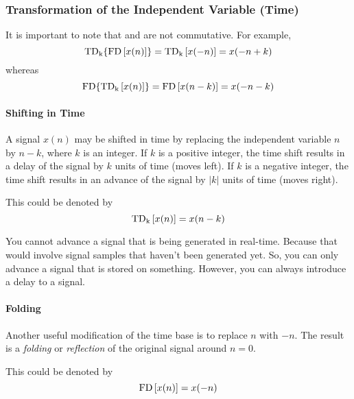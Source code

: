 \subsubsection{Transformation of the Independent Variable (Time)}\label{subsubsec:Transform Independent Variable}
It is important to note that  and  are not commutative.
For example,
\begin{equation}\label{eq:Delay then Fold}
  \operatorname{\mathrm{TD}_{k}} \lbrace \operatorname{\mathrm{FD}} \left[ x(n) \right] \rbrace = \operatorname{\mathrm{TD}_{k}} \left[ x(-n) \right] = x(-n + k)
\end{equation}
whereas
\begin{equation}\label{eq:Fold then Delay}
  \operatorname{\mathrm{FD}} \lbrace \operatorname{\mathrm{TD}_{k}} \left[ x(n) \right] \rbrace = \operatorname{\mathrm{FD}} \left[ x(n-k) \right] = x(-n-k)
\end{equation}

\paragraph{Shifting in Time}\label{par:Shifting in Time}
A signal $x(n)$ may be shifted in time by replacing the independent variable $n$ by $n-k$, where $k$ is an integer.
If $k$ is a positive integer, the time shift results in a delay of the signal by $k$ units of time (moves left).
If $k$ is a negative integer, the time shift results in an advance of the signal by $\lvert k \rvert$ units of time (moves right).

This could be denoted by
\begin{equation}\label{eq:Shifting in Time}
  \operatorname{\mathrm{TD}_{k}} \left[ x(n) \right] = x(n-k)
\end{equation}

You cannot advance a signal that is being generated in real-time.
Because that would involve signal samples that haven't been generated yet.
So, you can only advance a signal that is stored on something.
However, you can always introduce a delay to a signal.

\paragraph{Folding}\label{par:Folding}
Another useful modification of the time base is to replace $n$ with $-n$.
The result is a \emph{folding} or \emph{reflection} of the original signal around $n=0$.

This could be denoted by
\begin{equation}\label{eq:Folding}
  \operatorname{\mathrm{FD}} \left[ x(n) \right] = x(-n)
\end{equation}

